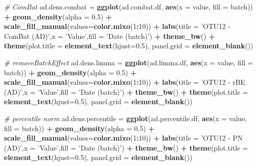 \documentclass[]{book}
\newenvironment{Shaded}{\begin{snugshade}}{\end{snugshade}}
\newcommand{\KeywordTok}[1]{\textcolor[rgb]{0.13,0.29,0.53}{\textbf{#1}}}
\newcommand{\DataTypeTok}[1]{\textcolor[rgb]{0.13,0.29,0.53}{#1}}
\newcommand{\DecValTok}[1]{\textcolor[rgb]{0.00,0.00,0.81}{#1}}
\newcommand{\FloatTok}[1]{\textcolor[rgb]{0.00,0.00,0.81}{#1}}
\newcommand{\StringTok}[1]{\textcolor[rgb]{0.31,0.60,0.02}{#1}}
\newcommand{\CommentTok}[1]{\textcolor[rgb]{0.56,0.35,0.01}{\textit{#1}}}
\newcommand{\OperatorTok}[1]{\textcolor[rgb]{0.81,0.36,0.00}{\textbf{#1}}}
\newcommand{\NormalTok}[1]{#1}
\begin{document}
\begin{Shaded}
\begin{Highlighting}[]
\CommentTok{# ComBat}
\NormalTok{ad.dens.combat =}\StringTok{ }\KeywordTok{ggplot}\NormalTok{(ad.combat.df, }\KeywordTok{aes}\NormalTok{(}\DataTypeTok{x =}\NormalTok{ value, }\DataTypeTok{fill =}\NormalTok{ batch)) }\OperatorTok{+}\StringTok{ }\KeywordTok{geom_density}\NormalTok{(}\DataTypeTok{alpha =} \FloatTok{0.5}\NormalTok{) }\OperatorTok{+}\StringTok{ }\KeywordTok{scale_fill_manual}\NormalTok{(}\DataTypeTok{values=}\KeywordTok{color.mixo}\NormalTok{(}\DecValTok{1}\OperatorTok{:}\DecValTok{10}\NormalTok{)) }\OperatorTok{+}\StringTok{ }\KeywordTok{labs}\NormalTok{(}\DataTypeTok{title =} \StringTok{'OTU12 - ComBat (AD)'}\NormalTok{,}\DataTypeTok{x =} \StringTok{'Value'}\NormalTok{,}\DataTypeTok{fill =} \StringTok{'Date (batch)'}\NormalTok{) }\OperatorTok{+}\StringTok{ }\KeywordTok{theme_bw}\NormalTok{() }\OperatorTok{+}\StringTok{ }\KeywordTok{theme}\NormalTok{(}\DataTypeTok{plot.title =} \KeywordTok{element_text}\NormalTok{(}\DataTypeTok{hjust=}\FloatTok{0.5}\NormalTok{), }\DataTypeTok{panel.grid =} \KeywordTok{element_blank}\NormalTok{())}


\CommentTok{# removeBatchEffect}
\NormalTok{ad.dens.limma =}\StringTok{ }\KeywordTok{ggplot}\NormalTok{(ad.limma.df, }\KeywordTok{aes}\NormalTok{(}\DataTypeTok{x =}\NormalTok{ value, }\DataTypeTok{fill =}\NormalTok{ batch)) }\OperatorTok{+}\StringTok{ }\KeywordTok{geom_density}\NormalTok{(}\DataTypeTok{alpha =} \FloatTok{0.5}\NormalTok{) }\OperatorTok{+}\StringTok{ }\KeywordTok{scale_fill_manual}\NormalTok{(}\DataTypeTok{values=}\KeywordTok{color.mixo}\NormalTok{(}\DecValTok{1}\OperatorTok{:}\DecValTok{10}\NormalTok{)) }\OperatorTok{+}\StringTok{ }\KeywordTok{labs}\NormalTok{(}\DataTypeTok{title =} \StringTok{'OTU12 - rBE (AD)'}\NormalTok{,}\DataTypeTok{x =} \StringTok{'Value'}\NormalTok{,}\DataTypeTok{fill =} \StringTok{'Date (batch)'}\NormalTok{) }\OperatorTok{+}\StringTok{ }\KeywordTok{theme_bw}\NormalTok{() }\OperatorTok{+}\StringTok{ }\KeywordTok{theme}\NormalTok{(}\DataTypeTok{plot.title =} \KeywordTok{element_text}\NormalTok{(}\DataTypeTok{hjust=}\FloatTok{0.5}\NormalTok{), }\DataTypeTok{panel.grid =} \KeywordTok{element_blank}\NormalTok{())}


\CommentTok{# percentile norm}
\NormalTok{ad.dens.percentile =}\StringTok{ }\KeywordTok{ggplot}\NormalTok{(ad.percentile.df, }\KeywordTok{aes}\NormalTok{(}\DataTypeTok{x =}\NormalTok{ value, }\DataTypeTok{fill =}\NormalTok{ batch)) }\OperatorTok{+}\StringTok{ }\KeywordTok{geom_density}\NormalTok{(}\DataTypeTok{alpha =} \FloatTok{0.5}\NormalTok{) }\OperatorTok{+}\StringTok{ }\KeywordTok{scale_fill_manual}\NormalTok{(}\DataTypeTok{values=}\KeywordTok{color.mixo}\NormalTok{(}\DecValTok{1}\OperatorTok{:}\DecValTok{10}\NormalTok{)) }\OperatorTok{+}\StringTok{ }\KeywordTok{labs}\NormalTok{(}\DataTypeTok{title =} \StringTok{'OTU12 - PN (AD)'}\NormalTok{,}\DataTypeTok{x =} \StringTok{'Value'}\NormalTok{,}\DataTypeTok{fill =} \StringTok{'Date (batch)'}\NormalTok{) }\OperatorTok{+}\StringTok{ }\KeywordTok{theme_bw}\NormalTok{() }\OperatorTok{+}\StringTok{ }\KeywordTok{theme}\NormalTok{(}\DataTypeTok{plot.title =} \KeywordTok{element_text}\NormalTok{(}\DataTypeTok{hjust=}\FloatTok{0.5}\NormalTok{), }\DataTypeTok{panel.grid =} \KeywordTok{element_blank}\NormalTok{())}



\end{Highlighting}
\end{Shaded}
\end{document}
